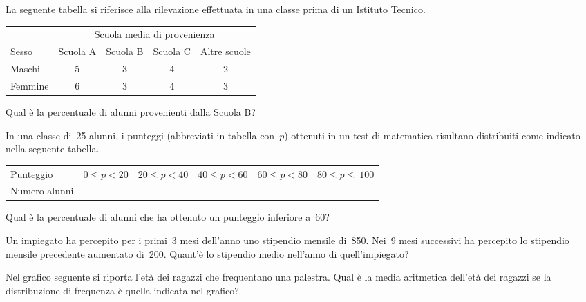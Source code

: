 \begin{esercizio}
\label{ese:A.52}
La seguente tabella si riferisce alla rilevazione effettuata in una classe 
prima di un Istituto Tecnico.
\begin{center}
 \begin{tabular}{l*{4}{c}}
\toprule
 & \multicolumn{4}{c}{Scuola media di provenienza}\\
Sesso & Scuola A & Scuola B & Scuola C & Altre scuole\\
\midrule
Maschi & 5 & 3 & 4 & 2 \\
Femmine & 6 & 3 & 4 & 3 \\
\bottomrule
\end{tabular}
\end{center}
Qual è la percentuale di alunni provenienti dalla Scuola B?
\end{esercizio}

\begin{esercizio}
\label{ese:A.53}
In una classe di~25 alunni, i punteggi (abbreviati in tabella con~\(p\)) 
ottenuti in un test di matematica risultano distribuiti come indicato nella 
seguente tabella.
\begin{center}
 \begin{tabular}{l*{5}{c}}
\toprule
Punteggio & \(0 \leq p < 20\) & \(20 \leq p < 40\) & \(40 \leq p < 60\) & \(60 
\leq p < 80\) & \(80 \leq p \leq~100\) \\
Numero alunni & & & & & \\
\bottomrule
\end{tabular}
\end{center}
Qual è la percentuale di alunni che ha ottenuto un punteggio inferiore a~60?
\end{esercizio}

\begin{esercizio}
\label{ese:A.54}
Un impiegato ha percepito per i primi~3 mesi dell'anno uno stipendio 
mensile di~850\officialeuro . Nei~9 mesi successivi ha percepito
lo stipendio mensile precedente aumentato di~200\officialeuro . Quant'è lo 
stipendio medio nell'anno di quell'impiegato?
\end{esercizio}

\begin{multicols}{2}
\begin{esercizio}
\label{ese:A.55}
Nel grafico seguente si riporta l'età dei ragazzi che frequentano una 
palestra. Qual è la media aritmetica dell'età dei ragazzi
se la distribuzione di frequenza è quella indicata nel grafico?
\begin{center}
 
\end{center}
\end{esercizio}
\end{multicols}

